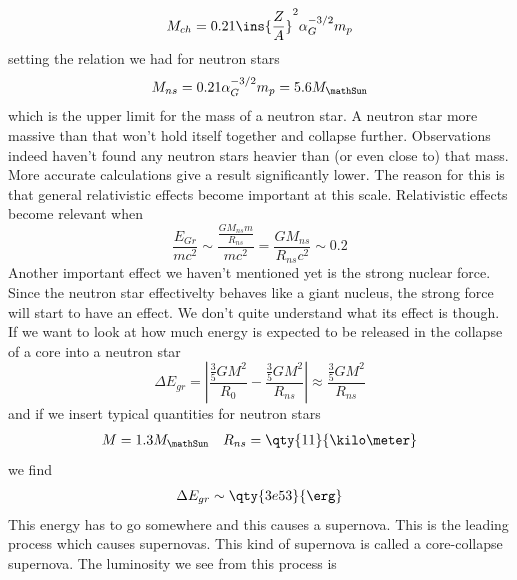 \begin{equation}
    M_{ch} = 0.21 \ins{\frac{Z}{A}}^2\alpha_G^{-3/2}m_p
\end{equation}
setting the relation we had for neutron stars
\begin{equation}
    M_{ns}=0.21\alpha_G^{-3/2}m_p = 5.6M_\mathSun
\end{equation}
which is the upper limit for the mass of a neutron star. A neutron star more massive than that won't hold itself together and collapse further. Observations indeed haven't found any neutron stars heavier than (or even close to) that mass. More accurate calculations give a result significantly lower. The reason for this is that general relativistic effects become important at this scale. Relativistic effects become relevant when
\begin{equation}
    \frac{E_{Gr}}{mc^2}\sim\frac{\frac{GM_{ns}m}{R_{ns}}}{mc^2}=\frac{GM_{ns}}{R_{ns}c^2}\sim 0.2
\end{equation}
Another important effect we haven't mentioned yet is the strong nuclear force. Since the neutron star effectivelty behaves like a giant nucleus, the strong force will start to have an effect. We don't quite understand what its effect is though. If we want to look at how much energy is expected to be released in the collapse of a core into a neutron star
\begin{equation}
    \Delta E_{gr} = \left\lvert\frac{\frac{3}{5}GM^2}{R_0}-\frac{\frac{3}{5}GM^2}{R_{ns}}\right\rvert \approx \frac{\frac{3}{5}GM^2}{R_{ns}}
\end{equation}
and if we insert typical quantities for neutron stars
\begin{align}
    M=1.3M_\mathSun && R_{ns} = \qty{11}{\kilo\meter}
\end{align}
we find
\begin{equation}
    \Delta E_{gr} \sim \qty{3e53}{\erg}
\end{equation}
This energy has to go somewhere and this causes a supernova. This is the leading process which causes supernovas. This kind of supernova is called a core-collapse supernova. The luminosity we see from this process is


